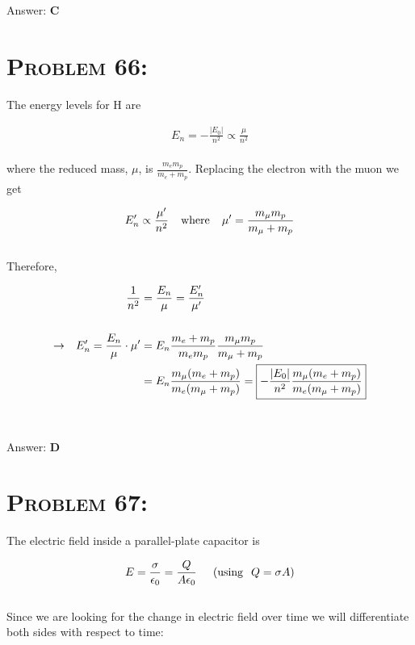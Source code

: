 \documentclass{article}
\begin{document}
Answer: \textbf{\textcolor{ProcessBlue}C}\\


\section{\textsc{Problem 66:}} The energy levels for H are

\begin{align}
E_{n} = - \frac{\left| E_{0} \right|}{n^2} \propto \frac{\mu}{n^{2}}
\end{align}
\\
where the reduced mass, $\mu$, is  $\frac{m_{e} m_{p}}{m_{e} + m_{p}}$. Replacing the electron with the muon we get

\begin{gather}
E'_{n} \propto \frac{\mu'}{n^{2}}\hspace{.15 in} \text{where} \hspace{.15 in}  \mu' = \frac{m_{\mu} m_{p}}{m_{\mu} + m_{p}}\nonumber
\end{gather}
\\
Therefore,

\begin{align}
\frac{1}{n^{2}} &= \frac{E_{n}}{\mu} = \frac{E'_{n}}{\mu'}\nonumber\\
\nonumber\\
\rightarrow \hspace{.1in} E'_{n} = \frac{E_{n}}{\mu} \cdot \mu' &= E_{n} \frac{m_{e} + m_{p}} {m_{e} m_{p}}   \frac{m_{\mu} m_{p}} {m_{\mu} + m_{p}}\nonumber\\
&= E_{n} \frac{m_{\mu} (m_{e} + m_{p})}{m_{e} (m_{\mu} + m_{p})} = \boxed{-\frac{|E_{0}|}{n^{2}} \frac{m_{\mu} (m_{e} + m_{p})}{m_{e} (m_{\mu} + m_{p})}}\nonumber
\end{align}
\\\\
Answer: \textbf{\textcolor{ProcessBlue}D}\\


\section{\textsc{Problem 67:}} The electric field inside a parallel-plate capacitor is

\begin{align}
E = \frac{\sigma}{\epsilon_{0}} = \frac{Q}{A \epsilon_{0}} \hspace{.2 in} (\text{using} \hspace{.1 in} Q = \sigma A)\nonumber
\end{align}
\\
Since we are looking for the change in electric field over time we will differentiate both sides with respect to time:
\end{document}

